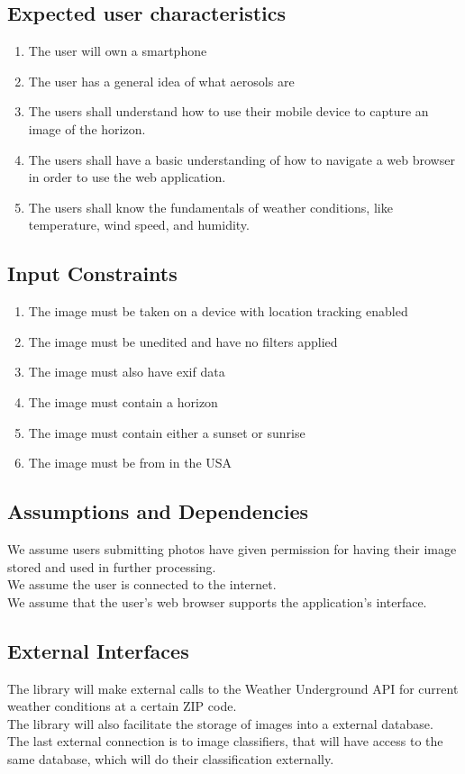 \documentclass[journal,10pt,draftclsnofoot,onecolumn]{IEEEtran}
\begin{document}
\begin{singlespace}
\subsection{Expected user characteristics}
\begin{enumerate}
\item The user will own a smartphone
\item The user has a general idea of what aerosols are
\item The users shall understand how to use their mobile device to capture an image of the horizon.
\item The users shall have a basic understanding of how to navigate a web browser in order to use the web application.
\item The users shall know the fundamentals of weather conditions, like temperature, wind speed, and humidity.
\end{enumerate}

\subsection{Input Constraints}
\begin{enumerate}
\item The image must be taken on a device with location tracking enabled
\item The image must be unedited and have no filters applied
\item The image must also have exif data
\item The image must contain a horizon
\item The image must contain either a sunset or sunrise
\item The image must be from in the USA
\end{enumerate}

\subsection{Assumptions and Dependencies}
We assume users submitting photos have given permission for having their image stored and used in further processing.\\
We assume the user is connected to the internet.\\
We assume that the user's web browser supports the application's interface.\\


\subsection{External Interfaces}
The library will make external calls to the Weather Underground API for current weather conditions at a certain ZIP code.\\
The library will also facilitate the storage of images into a external database.\\
The last external connection is to image classifiers, that will have access to the same database, which will do their classification externally.


\end{singlespace}
\end{document}

